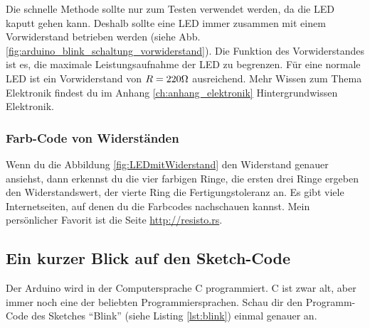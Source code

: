 Die schnelle Methode sollte nur zum Testen verwendet werden, da die LED kaputt gehen kann. Deshalb sollte eine LED immer zusammen mit einem Vorwiderstand betrieben werden (siehe Abb. \ref{fig:arduino_blink_schaltung_vorwiderstand}). Die Funktion des Vorwiderstandes ist es, die maximale Leistungsaufnahme der LED zu begrenzen. Für eine normale LED ist ein Vorwiderstand von $R=220\Omega$ ausreichend. Mehr Wissen zum Thema Elektronik findest du im Anhang \ref{ch:anhang_elektronik} Hintergrundwissen Elektronik.

\subsubsection{Farb-Code von Widerständen} 

Wenn du die Abbildung \ref{fig:LEDmitWiderstand} den Widerstand genauer ansiehst, dann erkennst du die vier farbigen Ringe, die ersten drei Ringe ergeben den Widerstandswert, der vierte Ring die Fertigungstoleranz an. Es gibt viele Internetseiten, auf denen du die Farbcodes nachschauen kannst. Mein persönlicher Favorit ist die Seite \url{http://resisto.rs}. 



\clearpage
\subsection{Ein kurzer Blick auf den Sketch-Code} 

Der Arduino wird in der Computersprache C programmiert. C ist zwar alt, aber immer noch eine der beliebten  Programmiersprachen.
Schau dir den Programm-Code des Sketches ``Blink'' (siehe Listing \ref{lst:blink}) einmal genauer an. 

